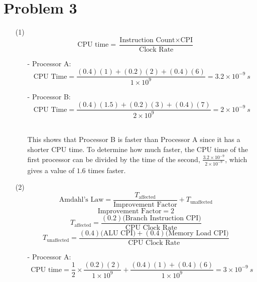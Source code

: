 \documentclass[12pt]{article}
\begin{document}
    \section*{Problem 3}
    \begin{enumerate}
        \item[(1)]
            \[
                \text{CPU time} = \frac{\text{Instruction Count} \times
                \text{CPI}}{\text{Clock Rate}}
            \]
            \begin{itemize}[leftmargin=*]
                    \item[-] Processor A:
                    \[
                        \text{CPU Time} = \frac{(0.4)(1)+(0.2)(2)+(0.4)(6)}{1
                        \times 10^{9}} = 3.2 \times 10^{-9}\ s
                    \]
                    \item[-] Processor B:
                    \[
                        \text{CPU Time} = \frac{(0.4)(1.5)+(0.2)(3)+(0.4)(7)}{2
                        \times 10^{9}} = 2 \times 10^{-9}\ s
                    \] \,
                    \item[]
                    This shows that Processor B is faster than Processor A since
                    it has a shorter CPU time. To determine how much faster, the
                    CPU time of the first processor can be divided by the time
                    of the second, $\frac{3.2 \times 10^{-9}}{2 \times
                    10^{-9}}$, which gives a value of $1.6$ times faster.
            \end{itemize}
        \item[(2)]
            \[
                \text{Amdahl's Law} =
                \frac{T_{\text{affected}}}{\text{Improvement Factor}} +
                T_{\text{unaffected}}
            \]
            \[
                \text{Improvement Factor} = 2
            \]
            \[
                T_{\text{affected}} = \frac{(0.2)\text{(Branch Instruction
                CPI)}}{\text{CPU Clock Rate}}
            \]
            \[
                T_{\text{unaffected}} = \frac{(0.4)\text{(ALU CPI)} +
                (0.4)\text{(Memory Load CPI)}}{\text{CPU Clock Rate}}
            \]
            \begin{itemize}
                \item[-] Processor A:
                    \[
                        \text{CPU time} = \frac{1}{2} \times \frac{(0.2)(2)}{1
                        \times 10^{9}} + \frac{(0.4)(1) + (0.4)(6)}{1 \times
                        10^{9}} = 3 \times 10^{-9}\ s
\]
\end{itemize}
\end{enumerate}
\end{document}
